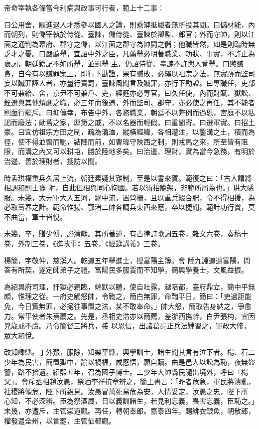 \begin{pinyinscope}
 帝命宰執各條當今利病與政事可行者，範上十二事：



 曰公用舍，願進退人才悉參以國人之論，則乘罅抵巇者無所投其間。曰儲材能，內而朝列，則儲宰執於侍從、臺諫，儲侍從、臺諫於卿監、郎官；外而守帥，則以江面之通判為幕府、郡守之儲，以江面之郡守為帥閫之儲；他職皆然，如是則臨時無乏才之憂。曰嚴薦舉，宜詔中外之臣，凡薦舉必明著職業、功狀、事實，不許止為褒詞，朝廷籍記不如所舉，並罰舉
 主，仍詔侍從、臺諫不許與人覓舉。曰懲贓貪，自今有以贓罪案上，即行下勘證，果有贓敗，必繩以祖宗之法，無實跡而監司妄以贓罪誣人者，亦量行責罰，臺諫風聞言及贓罪，亦行下勘證。曰專職任，吏部不可兼給、舍，京尹不可兼戶、吏，經筵亦必專官。曰久任使，內而財賦、獄訟、銓選與其他煩劇之職，必三年而後遷，外而監司、郡守，亦必使之再任，其不能者則亟行罷斥。曰抑僥幸，布告中外，各務職業，朝廷不以弊例而過恩，宮庭不以私
 謁而廢法；勛舊之家，邸第之戚，不以名器而輕假。曰重閫寄。曰選軍實。曰招土豪。曰宜仿祖宗方田之制，疏為溝洫，縱橫經緯，各相灌注，以鑿溝之土，積而為徑，使不得並轡而馳，結陣而前，如曹瑋守陜西之制，則戎馬之來，所至皆有阻限，而溝之內又可以耕屯，勝於陸地多矣。曰治邊、理財，實為當今急務，有明於治邊、善於理財者，搜訪以聞。



 時孟珙權重兵久居上流，朝廷素疑其難制，至是以書來賀。範復之曰：「古人謂將相調和則士豫
 附，自此但相與同心徇國。若以術相籠架，非範所屑為也。」珙大感服。未幾，大元軍大入五河，絕中流，置營柵，且以重兵綴合肥，令不得相援，為必取壽春之計。範命惟揚、鄂渚二帥各調兵東西來應，卒以捷聞。範計功行賞，莫不曲當，軍士皆悅。



 未幾，卒，贈少傅，謚清獻。其所著述，有古律詩歌詞五卷，雜文六卷，奏稿十卷，外制三卷，《進故事》五卷，《經筵講義》三卷。



 楊簡，字敬仲，慈溪人。乾道五年舉進士，授富陽主簿。會
 陸九淵道過富陽，問答有所契，遂定師弟子之禮。富陽民多服賈而不知學，簡興學養士，文風益振。



 為紹興府司理，犴獄必親臨，端默以聽，使自吐露。越陪都，臺府鼎立，簡中平無頗，惟理之從。一府史觸怒帥，令鞫之，簡白無罪，命鞫平日，簡曰：「吏過詎能免，今日實無罪，必擿往事置之法，某不敢奉命。」帥大怒，簡取告身納之，爭愈力。常平使者朱熹薦之。先是，丞相史浩亦以簡薦，差浙西撫幹，白尹張枃，宜因兇歲戒不虞。乃令簡督三將兵，接
 以恩信，出諸葛亮正兵法肄習之，軍政大修，眾大和悅。



 改知嵊縣。丁外艱，服除，知樂平縣，興學訓士，諸生聞其言有泣下者。楊、石二少年為民害，簡置獄中，諭以禍福，咸感悟，願自贖。由是邑人以訟為恥，夜無盜警，路不拾遺。紹熙五年，召為國子博士。二少年大帥縣民隨出境外，呼曰「楊父」。會斥丞相趙汝愚，祭酒李祥抗章辨之，簡上書言：「昨者危急，軍民將潰亂，社稷將傾危，陛下所親見。汝愚冒萬死易危為安，人情妥定，汝愚之忠，陛下所
 心知，不必深辨。臣為祭酒屬，日以義訓諸生，若見利忘義，畏害忘義，臣恥之。」未幾，亦遭斥，主管崇道觀。再任，轉朝奉郎。嘉泰四年，賜緋衣銀魚，朝散郎，權發遣全州，以言罷，主管仙都觀。




\end{pinyinscope}
